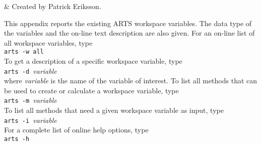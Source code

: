  \label{app:wsv}


 & Created by Patrick Eriksson. \\
\stophistory

 This appendix reports the existing ARTS workspace variables. The
 data type of the variables and the on-line text description are also
 given. For an on-line list of all workspace variables, type\\

 \verb|arts -w all| \\

 \noindent
 To get a description of a specific workspace variable, type\\

 \verb|arts -d |{\it variable} \\

 \noindent
 where {\it variable} is the name of the variable of interest. To list
 all methods that can be used to create or calculate a workspace variable,
 type \\

 \verb|arts -m |{\it variable} \\

 \noindent
 To list all methods that need a given workspace variable as input,
 type \\

 \verb|arts -i |{\it variable} \\

 \noindent
 For a complete list of online help options, type\\ 

 \verb|arts -h| \\
 
 {\footnotesize
  }



